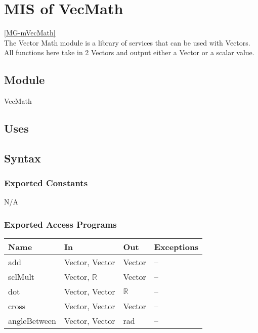 \documentclass[12pt, titlepage]{article}
\begin{document}

\newpage

\section{MIS of VecMath} \ref{MG-mVecMath} \\
The Vector Math module is a library of services that can be used with Vectors. 
All functions here take in 2 Vectors and output either a Vector or a scalar 
value.

\subsection{Module}
VecMath

\subsection{Uses}

\subsection{Syntax}
\subsubsection{Exported Constants}
N/A
\subsubsection{Exported Access Programs}
\begin{center}
	\begin{tabular}{p{3cm} p{4cm} p{2cm} p{4cm}}
		\hline
		\textbf{Name} & \textbf{In} & \textbf{Out} & \textbf{Exceptions} \\
		\hline
		add & Vector, Vector & Vector & -- \\
		sclMult & Vector, $\mathbb{R}$ & Vector & -- \\ 
		dot & Vector, Vector & $\mathbb{R}$ & -- \\
		cross & Vector, Vector & Vector & -- \\
		angleBetween & Vector, Vector & rad & -- \\
		\hline
	\end{tabular}
\end{center}
\end{document}
